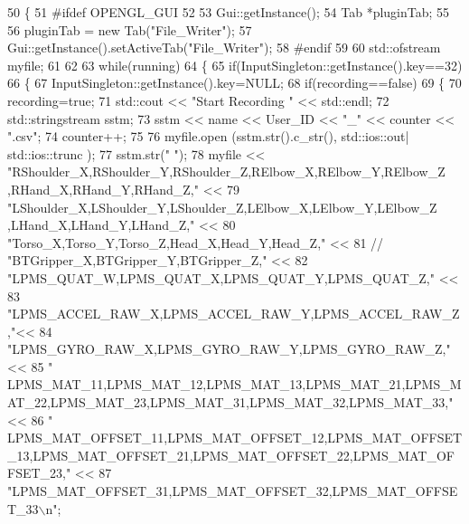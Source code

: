 \begin{DoxyCode}
50 \{
51 \textcolor{preprocessor}{    #ifdef OPENGL\_GUI
}
52     
53     Gui::getInstance();
54     Tab *pluginTab;
55     
56     pluginTab = \textcolor{keyword}{new} Tab(\textcolor{stringliteral}{"File\_Writer"});
57     Gui::getInstance().setActiveTab(\textcolor{stringliteral}{"File\_Writer"});
58 \textcolor{preprocessor}{    #endif
}
59     
60     std::ofstream myfile;
61 
62 
63     \textcolor{keywordflow}{while}(running)
64     \{
65         \textcolor{keywordflow}{if}(InputSingleton::getInstance().key==32)
66         \{
67             InputSingleton::getInstance().key=NULL;
68             \textcolor{keywordflow}{if}(recording==\textcolor{keyword}{false})
69             \{
70                 recording=\textcolor{keyword}{true};
71                 std::cout << \textcolor{stringliteral}{"Start Recording "} << std::endl;
72                 std::stringstream sstm;
73                 sstm << name << User\_ID << \textcolor{stringliteral}{"\_"} << counter << \textcolor{stringliteral}{".csv"};
74                 counter++;
75 
76                 myfile.open (sstm.str().c\_str(), std::ios::out| std::ios::trunc );
77                 sstm.str(\textcolor{stringliteral}{" "});
78                 myfile << \textcolor{stringliteral}{"RShoulder\_X,RShoulder\_Y,RShoulder\_Z,RElbow\_X,RElbow\_Y,RElbow\_Z
       ,RHand\_X,RHand\_Y,RHand\_Z,"} <<
79                        \textcolor{stringliteral}{"LShoulder\_X,LShoulder\_Y,LShoulder\_Z,LElbow\_X,LElbow\_Y,LElbow\_Z
       ,LHand\_X,LHand\_Y,LHand\_Z,"} <<
80                        \textcolor{stringliteral}{"Torso\_X,Torso\_Y,Torso\_Z,Head\_X,Head\_Y,Head\_Z,"} <<
81 \textcolor{comment}{//                        "BTGripper\_X,BTGripper\_Y,BTGripper\_Z," <<}
82                        \textcolor{stringliteral}{"LPMS\_QUAT\_W,LPMS\_QUAT\_X,LPMS\_QUAT\_Y,LPMS\_QUAT\_Z,"} <<
83                        \textcolor{stringliteral}{"LPMS\_ACCEL\_RAW\_X,LPMS\_ACCEL\_RAW\_Y,LPMS\_ACCEL\_RAW\_Z,"}<<
84                        \textcolor{stringliteral}{"LPMS\_GYRO\_RAW\_X,LPMS\_GYRO\_RAW\_Y,LPMS\_GYRO\_RAW\_Z,"} <<
85                        \textcolor{stringliteral}{"
      LPMS\_MAT\_11,LPMS\_MAT\_12,LPMS\_MAT\_13,LPMS\_MAT\_21,LPMS\_MAT\_22,LPMS\_MAT\_23,LPMS\_MAT\_31,LPMS\_MAT\_32,LPMS\_MAT\_33,"} <<
86                        \textcolor{stringliteral}{"
      LPMS\_MAT\_OFFSET\_11,LPMS\_MAT\_OFFSET\_12,LPMS\_MAT\_OFFSET\_13,LPMS\_MAT\_OFFSET\_21,LPMS\_MAT\_OFFSET\_22,LPMS\_MAT\_OFFSET\_23,"} <<
87                        \textcolor{stringliteral}{"LPMS\_MAT\_OFFSET\_31,LPMS\_MAT\_OFFSET\_32,LPMS\_MAT\_OFFSET\_33\(\backslash\)n"};

\end{DoxyCode}
